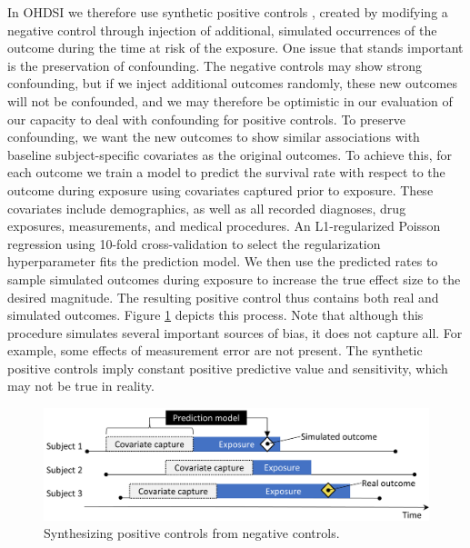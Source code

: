 \documentclass[]{book}
\begin{document}
In OHDSI we therefore use synthetic positive controls
\citep{schuemie_2018}, created by modifying a negative control through
injection of additional, simulated occurrences of the outcome during the
time at risk of the exposure. One issue that stands important is the
preservation of confounding. The negative controls may show strong
confounding, but if we inject additional outcomes randomly, these new
outcomes will not be confounded, and we may therefore be optimistic in
our evaluation of our capacity to deal with confounding for positive
controls. To preserve confounding, we want the new outcomes to show
similar associations with baseline subject-specific covariates as the
original outcomes. To achieve this, for each outcome we train a model to
predict the survival rate with respect to the outcome during exposure
using covariates captured prior to exposure. These covariates include
demographics, as well as all recorded diagnoses, drug exposures,
measurements, and medical procedures. An L1-regularized Poisson
regression \citep{suchard_2013} using 10-fold cross-validation to select
the regularization hyperparameter fits the prediction model. We then use
the predicted rates to sample simulated outcomes during exposure to
increase the true effect size to the desired magnitude. The resulting
positive control thus contains both real and simulated outcomes. Figure
\ref{fig:posControlSynth} depicts this process. Note that although this
procedure simulates several important sources of bias, it does not
capture all. For example, some effects of measurement error are not
present. The synthetic positive controls imply constant positive
predictive value and sensitivity, which may not be true in reality.

\begin{figure}

{\centering \includegraphics[width=0.9\linewidth]{images/MethodValidity/posControlSynth} 

}

\caption{Synthesizing positive controls from negative controls.}\label{fig:posControlSynth}
\end{figure}
\end{document}
